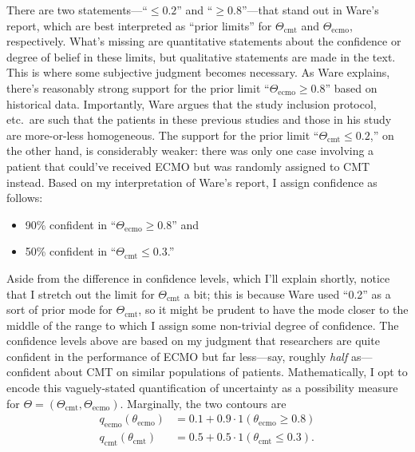 \documentclass[a4paper, 12pt]{article}
\theoremstyle{plain}
\theoremstyle{definition}
\theoremstyle{remark}
\begin{document}
There are two statements---``$\leq 0.2$'' and ``$\geq 0.8$''---that stand out in Ware's report, which are best interpreted as ``prior limits'' for $\Theta_\text{cmt}$ and $\Theta_\text{ecmo}$, respectively.  What's missing are quantitative statements about the confidence or degree of belief in these limits, but qualitative statements are made in the text.  This is where some subjective judgment becomes necessary.  As Ware explains, there's reasonably strong support for the prior limit ``$\Theta_\text{ecmo} \geq 0.8$'' based on historical data.  Importantly, Ware argues that the study inclusion protocol, etc.~are such that the patients in these previous studies and those in his study are more-or-less homogeneous.  The support for the prior limit ``$\Theta_\text{cmt} \leq 0.2$,'' on the other hand, is considerably weaker: there was only one case involving a patient that could've received ECMO but was randomly assigned to CMT instead.
Based on my interpretation of Ware's report, I assign confidence as follows:
\begin{itemize}
\item 90\% confident in ``$\Theta_\text{ecmo} \geq 0.8$'' and
\vspace{-2mm}
\item 50\% confident in ``$\Theta_\text{cmt} \leq 0.3$.'' 
\end{itemize}
Aside from the difference in confidence levels, which I'll explain shortly, notice that I stretch out the limit for $\Theta_\text{cmt}$ a bit; this is because Ware used ``0.2'' as a sort of prior mode for $\Theta_\text{cmt}$, so it might be prudent to have the mode closer to the middle of the range to which I assign some non-trivial degree of confidence.  The confidence levels above are based on my judgment that researchers are quite confident in the performance of ECMO but far less---say, roughly {\em half} as---confident about CMT on similar populations of patients.  Mathematically, I opt to encode this vaguely-stated quantification of uncertainty as a possibility measure for $\Theta=(\Theta_\text{cmt}, \Theta_\text{ecmo})$.  Marginally, the two contours are
\begin{align*}
q_\text{ecmo}(\theta_\text{ecmo}) & = 0.1 + 0.9 \cdot 1(\theta_\text{ecmo} \geq 0.8) \\
q_\text{cmt}(\theta_\text{cmt}) & = 0.5 + 0.5 \cdot 1(\theta_\text{cmt} \leq 0.3).
\end{align*}
\end{document}
